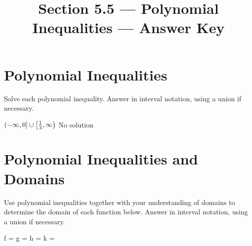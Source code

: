 

\title{Section 5.5 --- Polynomial Inequalities --- Answer Key}


\maketitle

\section*{Polynomial Inequalities}
Solve each polynomial inequality. Answer in interval notation, using a union if necessary.
\begin{smenum}
\maitemxx
{\cup{}}
{\cup{}}
\mitemxx
{$\left(-\infty,0\right]\cup\left[\frac{1}{3},\infty\right)$}
{No solution}
\maitemxx
{\cup{}}
{\cup{}}
\maitemxx
{\cup{}}
{\cup{}}
\maitemxx
{}
{\cup{}}
\maitemxx
{\cup{}}
{}
\maitemxx
{\cup{}}
{\cup{}}
\maitemxx
{\cup{}}
{\cup{}}
\end{smenum}
\section*{Polynomial Inequalities and Domains}
Use polynomial inequalities together with your understanding of domains to determine the domain of each function below. Answer in interval notation, using a union if necessary.
\begin{smenum}
\maitemxx
{\dom f = }
{\dom g = \cup{}}
\maitemxx
{\dom h = \cup{}}
{\dom k = \cup{}}
\end{smenum}
